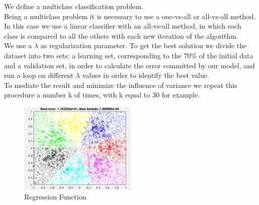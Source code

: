 
We define a multiclass classification problem.\\
Being a multiclass problem it is necessary to use a one-vs-all or all-vs-all method.
In this case we use a linear classifier with an all-vs-all method, in which each class is compared to all the others with each new iteration of the algorithm.\\
We use a $\lambda$ as regularization parameter.
To get the best solution we divide the dataset into two sets: a learning set, corresponding to the $ 70 \% $ of the initial data and a validation set, in order to calculate the error committed by our model, and run a loop on different $\lambda$ values in order to identify the best value.\\
To mediate the result and minimize the influence of variance we repeat this procedure a number k of times, with k equal to 30 for example.
\begin{figure}[h]
	\centering
	\includegraphics[width=0.5\textwidth]{i1.png}
	\caption{Regression Function}
	\label{fig:regression function}
\end{figure}


